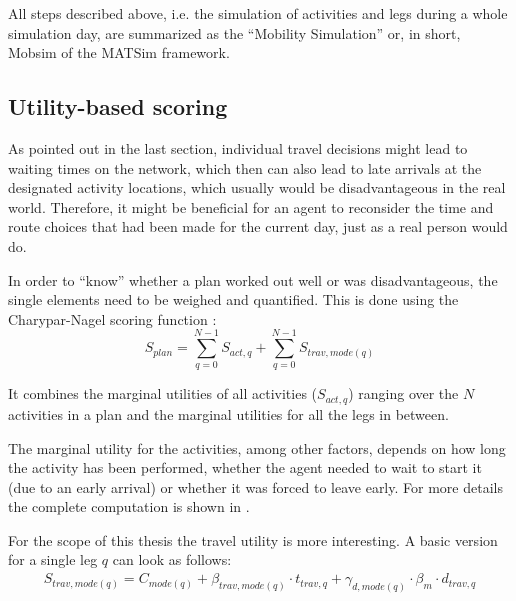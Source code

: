 All steps described above, i.e. the simulation of activities and legs during
a whole simulation day, are summarized as the ``Mobility Simulation'' or, in short, Mobsim
of the MATSim framework.

\subsection{Utility-based scoring}
\label{sec:utility}

As pointed out in the last section, individual travel decisions might lead to
waiting times on the network, which then can also lead to late arrivals at the
designated activity locations, which usually would be disadvantageous in the real
world. Therefore, it might be beneficial for an agent to reconsider the time and
route choices that had been made for the current day, just as a real person
would do.

In order to ``know'' whether a plan worked out well or was disadvantageous, the
single elements need to be weighed and quantified. This is done using the Charypar-Nagel
scoring function \citep{Horni2015}:
\begin{equation}
S_{plan} = \sum_{q=0}^{N-1} S_{act,q} + \sum_{q=0}^{N-1} S_{trav,mode(q)}
\end{equation}

It combines the marginal utilities of all activities ($S_{act,q}$) ranging
over the $N$ activities in a plan and the marginal utilities for all the legs in
between.

The marginal utility for the activities, among other factors, depends on how long
the activity has been performed, whether the agent needed to wait to start it (due
to an early arrival) or whether it was forced to leave early. For more details
the complete computation is shown in \citep{Horni2015}.

For the scope of this thesis the travel utility is more interesting. A basic version
for a single leg $q$ can look as follows:
\begin{equation}\begin{aligned}
S_{trav,mode(q)} = C_{mode(q)} + \beta_{trav,mode(q)} \cdot t_{trav,q} + \gamma_{d,mode(q)} \cdot \beta_{m} \cdot d_{trav,q}
\end{aligned}\end{equation}

